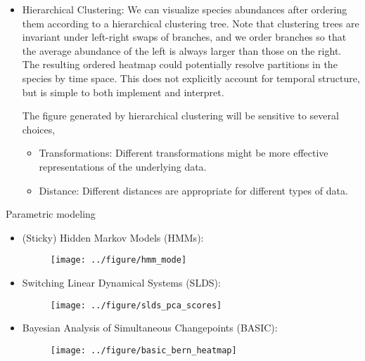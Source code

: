 \documentclass[final, 8pt]{beamer}
\newlength{\onecolwid}
\begin{document}
\begin{frame}
\begin{columns}
\begin{column}{\onecolwid}
\begin{itemize}
\item Hierarchical Clustering: 
We can visualize species abundances after ordering them according to a
hierarchical clustering tree. Note that clustering trees are invariant under
left-right swaps of branches, and we order branches so that the average
abundance of the left is always larger than those on the right. The resulting
ordered heatmap could potentially resolve partitions in the species by time
space. This does not explicitly account for temporal structure, but is simple to
both implement and interpret.

The figure generated by hierarchical clustering will be sensitive to several
choices,
\begin{itemize}
\item Transformations: Different transformations might be more effective
  representations of the underlying data.
\item Distance: Different distances are appropriate for different types of data.
\end{itemize}
\end{itemize}

\begin{block}{Parametric modeling}
\begin{itemize}
\item (Sticky) Hidden Markov Models (HMMs):

\begin{figure}[ht]
  \centering
  \texttt{[image: ../figure/hmm\_mode]}
  \caption{\label{fig:hmm_mode}}
\end{figure}


\item Switching Linear Dynamical Systems (SLDS):

\begin{figure}[ht]
  \centering
  \texttt{[image: ../figure/slds\_pca\_scores]}
  \caption{\label{fig:slds_pca_scores} }
\end{figure}

\item Bayesian Analysis of Simultaneous Changepoints (BASIC):
\begin{figure}[ht]
  \centering
  \texttt{[image: ../figure/basic\_bern\_heatmap]}
  \caption{\label{fig:basic_bern_heamtap} }
\end{figure}
\end{itemize}


\end{block}
\end{column}
\end{columns}
\end{frame}
\end{document}
